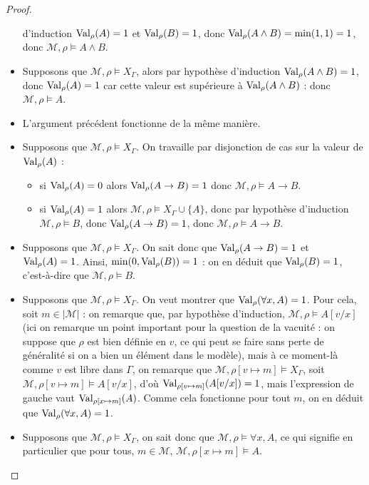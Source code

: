 \begin{proof}
\begin{itemize}
    d'induction $\operatorname{Val}_\rho(A) = 1$ et $\operatorname{Val}_\rho(B) = 1$, donc
    $\operatorname{Val}_\rho(A\land B) = \min(1,1) = 1$, donc
    $\mathcal M,\rho\models A\land B$.
  \item Supposons que $\mathcal M,\rho\models X_\Gamma$, alors par hypothèse
    d'induction $\operatorname{Val}_\rho(A\land B) = 1$, donc $\operatorname{Val}_\rho(A) = 1$ car cette
    valeur est supérieure à $\operatorname{Val}_\rho(A\land B)$ : donc
    $\mathcal M,\rho\models A$.
  \item L'argument précédent fonctionne de la même manière.
  \item Supposons que $\mathcal M,\rho\models X_\Gamma$. On travaille par
    disjonction de cas sur la valeur de $\operatorname{Val}_\rho(A)$ :
    \begin{itemize}
    \item si $\operatorname{Val}_\rho(A) = 0$ alors $\operatorname{Val}_\rho(A\to B) = 1$ donc
      $\mathcal M,\rho\models A \to B$.
    \item si $\operatorname{Val}_\rho(A) = 1$ alors $\mathcal M,\rho\models X_\Gamma\cup\{A\}$,
      donc par hypothèse d'induction $\mathcal M,\rho\models B$, donc
      $\operatorname{Val}_\rho(A\to B) = 1$, donc $\mathcal M,\rho\models A \to B$.
    \end{itemize}
  \item Supposons que $\mathcal M,\rho\models X_\Gamma$. On sait donc que
    $\operatorname{Val}_\rho(A\to B) = 1$ et $\operatorname{Val}_\rho(A) = 1$. Ainsi,
    $\min(0,\operatorname{Val}_\rho(B)) = 1$ : on en déduit que $\operatorname{Val}_\rho(B) = 1$, c'est-à-dire
    que $\mathcal M,\rho\models B$.
  \item Supposons que $\mathcal M,\rho\models X_\Gamma$. On veut montrer que
    $\operatorname{Val}_\rho(\forall x, A) = 1$. Pour cela, soit $m \in |\mathcal M|$ : on
    remarque que, par hypothèse d'induction, $\mathcal M,\rho\models A[v/x]$
    (ici on remarque un point important pour la question de la vacuité : on
    suppose que $\rho$ est bien définie en $v$, ce qui peut se faire sans
    perte de généralité si on a bien un élément dans le modèle), mais à ce
    moment-là comme $v$ est libre dans $\Gamma$, on remarque que
    $\mathcal M,\rho[v\mapsto m]\models X_\Gamma$, soit
    $\mathcal M,\rho[v\mapsto m]\models A[v/x]$, d'où
    $\operatorname{Val}_{\rho[v\mapsto m]}(A[v/x]) = 1$, mais l'expression de gauche vaut
    $\operatorname{Val}_{\rho[x\mapsto m]}(A)$. Comme cela fonctionne pour tout $m$, on en
    déduit que $\operatorname{Val}_\rho(\forall x, A) = 1$.
  \item Supposons que $\mathcal M, \rho\models X_\Gamma$, on sait donc que
    $\mathcal M,\rho\models \forall x, A$, ce qui signifie en particulier que
    pour tous, $m\in\mathcal M$, $\mathcal M,\rho[x\mapsto m]\models A$.

\end{itemize}
\end{proof}
